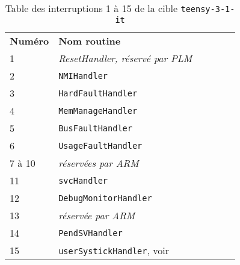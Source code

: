 \begin{table}[!t]
  \centering
  \begin{tabular}{llllll}
    \textbf{Numéro}& \textbf{Nom routine} \\
    1  & \emph{ResetHandler, réservé par PLM} \\
    2  & \texttt{NMIHandler}\\
    3  & \texttt{HardFaultHandler}\\
    4  & \texttt{MemManageHandler}\\
    5  & \texttt{BusFaultHandler}\\
    6  & \texttt{UsageFaultHandler}\\
    7 à 10 & \emph{réservées par ARM} \\
    11 & \texttt{svcHandler}\\
    12 & \texttt{DebugMonitorHandler}\\
    13 & \emph{réservée par ARM} \\
    14 & \texttt{PendSVHandler}\\
    15 & \texttt{userSystickHandler}, voir {SystickPourTeensy31It} \\
  \end{tabular}
  \caption{Table des interruptions 1 à 15 de la cible \texttt{teensy-3-1-it}}
  \ligne
\end{table}

